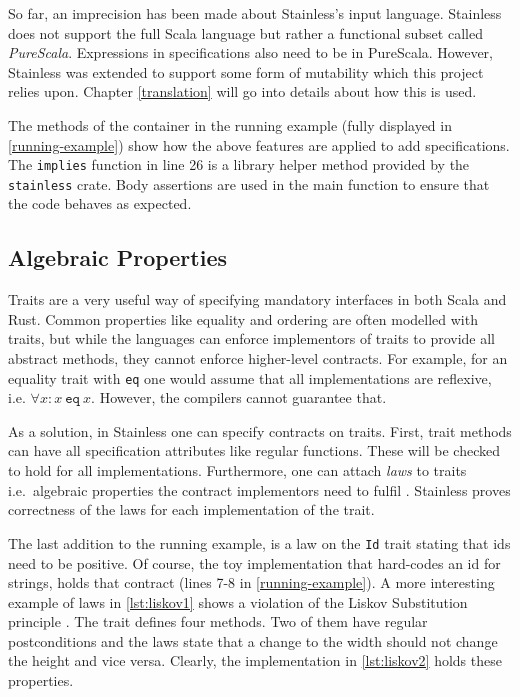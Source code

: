 So far, an imprecision has been made about Stainless's input language. Stainless
does not support the full Scala language but rather a functional subset called
\emph{PureScala}. Expressions in specifications also need to be in PureScala.
However, Stainless was extended to support some form of mutability \cite{regb}
which this project relies upon. Chapter \ref{translation} will go into details
about how this is used.

The methods of the container in the running example (fully displayed in
\autoref{running-example}) show how the above features are applied to add
specifications. The \lstinline!implies! function in line 26 is a library helper
method provided by the \lstinline!stainless! crate. Body assertions are used in
the main function to ensure that the code behaves as expected.

\subsection{Algebraic Properties}
\label{laws-intro}

Traits are a very useful way of specifying mandatory interfaces in both Scala
and Rust. Common properties like equality and ordering are often modelled with
traits, but while the languages can enforce implementors of traits to provide
all abstract methods, they cannot enforce higher-level contracts. For example,
for an equality trait with \texttt{eq} one would assume that all implementations
are reflexive, i.e. $\forall x: x~\mathtt{eq}~x$. However, the compilers cannot
guarantee that.

As a solution, in Stainless one can specify contracts on traits. First, trait
methods can have all specification attributes like regular functions. These will
be checked to hold for all implementations. Furthermore, one can attach
\emph{laws} to traits i.e.~algebraic properties the contract implementors need
to fulfil \cite[section "Specifying Algebraic Properties"]{stainless-doc}.
Stainless proves correctness of the laws for each implementation of the trait.

The last addition to the running example, is a law on the \lstinline!Id! trait
stating  that ids need to be positive. Of course, the toy implementation that
hard-codes an id for strings, holds that contract (lines 7-8 in
\autoref{running-example}). A more interesting example of laws in
\autoref{lst:liskov1} shows a violation of the  Liskov Substitution principle
\cite{liskov}. The trait defines four methods. Two of them have regular
postconditions and the laws state that a change to the width should not change
the height and vice versa. Clearly, the implementation in \autoref{lst:liskov2}
holds these properties.

